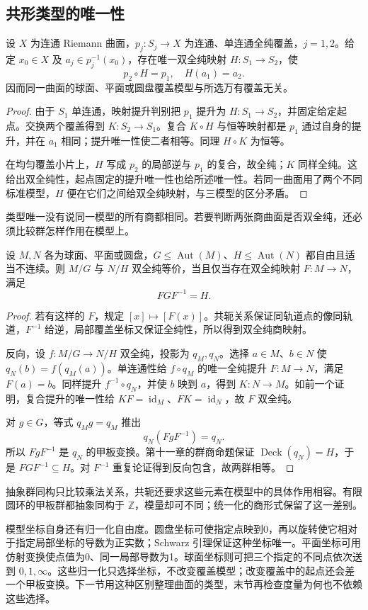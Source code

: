 \subsection{共形类型的唯一性}
\label{b3:subsec:120204}

\begin{proposition}[万有覆盖模型的唯一性]\label{b3:prop:12-cover-type-unique}
设 \(X\) 为连通 Riemann 曲面，\(p_j:S_j\to X\) 为连通、单连通全纯覆盖，\(j=1,2\)。给定 \(x_0\in X\) 及 \(a_j\in p_j^{-1}(x_0)\)，存在唯一双全纯映射 \(H:S_1\to S_2\)，使
\[
 p_2\circ H=p_1,\quad H(a_1)=a_2.
\]
因而同一曲面的球面、平面或圆盘覆盖模型与所选万有覆盖无关。
\end{proposition}
\begin{proof}
由于 \(S_1\) 单连通，映射提升判别把 \(p_1\) 提升为 \(H:S_1\to S_2\)，并固定给定起点。交换两个覆盖得到 \(K:S_2\to S_1\)。复合 \(K\circ H\) 与恒等映射都是 \(p_1\) 通过自身的提升，并在 \(a_1\) 相同；提升唯一性使二者相等。同理 \(H\circ K\) 为恒等。

在均匀覆盖小片上，\(H\) 写成 \(p_2\) 的局部逆与 \(p_1\) 的复合，故全纯；\(K\) 同样全纯。这给出双全纯性，起点固定的提升唯一性也给所述唯一性。若同一曲面用了两个不同标准模型，\(H\) 便在它们之间给双全纯映射，与三模型的区分矛盾。
\end{proof}

类型唯一没有说同一模型的所有商都相同。若要判断两张商曲面是否双全纯，还必须比较群怎样作用在模型上。

\begin{proposition}[商曲面与群作用的共轭]\label{b3:prop:12-quotient-conjugacy}
设 \(M,N\) 各为球面、平面或圆盘，\(G\le\operatorname{Aut}(M)\)、\(H\le\operatorname{Aut}(N)\) 都自由且适当不连续。则 \(M/G\) 与 \(N/H\) 双全纯等价，当且仅当存在双全纯映射 \(F:M\to N\)，满足
\[
 FGF^{-1}=H.
\]
\end{proposition}
\begin{proof}
若有这样的 \(F\)，规定 \([x]\mapsto[F(x)]\)。共轭关系保证同轨道点的像同轨道，\(F^{-1}\) 给逆，局部覆盖坐标又保证全纯性，所以得到双全纯商映射。

反向，设 \(f:M/G\to N/H\) 双全纯，投影为 \(q_M,q_N\)。选择 \(a\in M\)、\(b\in N\) 使 \(q_N(b)=f(q_M(a))\)。单连通性给 \(f\circ q_M\) 的唯一全纯提升 \(F:M\to N\)，满足 \(F(a)=b\)。同样提升 \(f^{-1}\circ q_N\)，并使 \(b\) 映到 \(a\)，得到 \(K:N\to M\)。如前一个证明，复合提升的唯一性给 \(KF=\operatorname{id}_M\)、\(FK=\operatorname{id}_N\)，故 \(F\) 双全纯。

对 \(g\in G\)，等式 \(q_Mg=q_M\) 推出
\[
 q_N(FgF^{-1})=q_N.
\]
所以 \(FgF^{-1}\) 是 \(q_N\) 的甲板变换。第十一章的群商命题保证 \(\operatorname{Deck}(q_N)=H\)，于是 \(FGF^{-1}\subseteq H\)。对 \(F^{-1}\) 重复论证得到反向包含，故两群相等。
\end{proof}
抽象群同构只比较乘法关系，共轭还要求这些元素在模型中的具体作用相容。有限圆环的甲板群都抽象同构于 \(\mathbb Z\)，模量却可不同；统一化的商形式保留了这一差别。

\ProseParagraphBreak
模型坐标自身还有归一化自由度。圆盘坐标可使指定点映到0，再以旋转使它相对于指定局部坐标的导数为正实数；Schwarz 引理保证这种坐标唯一。平面坐标可用仿射变换使点值为0、同一局部导数为1。球面坐标则可把三个指定的不同点依次送到 \(0,1,\infty\)。这些归一化只选择坐标，不改变覆盖模型；改变覆盖中的起点还会差一个甲板变换。下一节用这种区别整理曲面的类型，末节再检查度量为何也不依赖这些选择。
